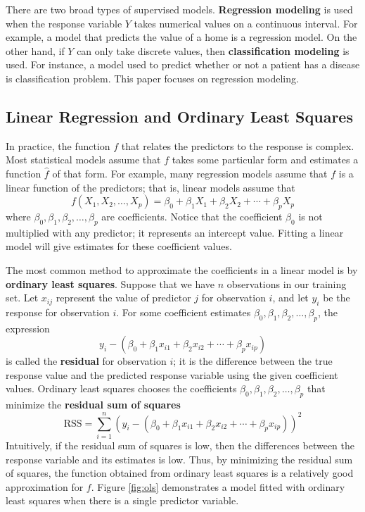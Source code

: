 \documentclass{article}
\begin{document}
There are two broad types of supervised models. \textbf{Regression modeling} is used when the response variable $Y$ takes numerical values on a continuous interval. For example, a model that predicts the value of a home is a regression model. On the other hand, if $Y$ can only take discrete values, then \textbf{classification modeling} is used. For instance, a model used to predict whether or not a patient has a disease is classification problem. This paper focuses on regression modeling.

\subsection{Linear Regression and Ordinary Least Squares}

In practice, the function $f$ that relates the predictors to the response is complex. Most statistical models assume that $f$ takes some particular form and estimates a function $\hat{f}$ of that form. For example, many regression models assume that $f$ is a linear function of the predictors; that is, linear models assume that
\begin{equation}\label{eqn:linear-model}
	f(X_1, X_2, \dotsc, X_p) = \beta_0 + \beta_1 X_1 + \beta_2 X_2 + \cdots + \beta_p X_p
\end{equation}
where $\beta_0, \beta_1, \beta_2, \dotsc, \beta_p$ are coefficients. Notice that the coefficient $\beta_0$ is not multiplied with any predictor; it represents an intercept value. Fitting a linear model will give estimates for these coefficient values.

The most common method to approximate the coefficients in a linear model is by \textbf{ordinary least squares}. Suppose that we have $n$ observations in our training set. Let $x_{ij}$ represent the value of predictor $j$ for observation $i$, and let $y_i$ be the response for observation $i$. For some coefficient estimates $\beta_0, \beta_1, \beta_2, \dotsc, \beta_p$, the expression
\begin{equation}
	y_i - (\beta_0 + \beta_1 x_{i1} + \beta_2 x_{i2} + \cdots + \beta_p x_{ip})
\end{equation}
is called the \textbf{residual} for observation $i$; it is the difference between the true response value and the predicted response variable using the given coefficient values. Ordinary least squares chooses the coefficients $\beta_0, \beta_1, \beta_2, \dotsc, \beta_p$ that minimize the \textbf{residual sum of squares}
\begin{equation}\label{eqn:RSS}
	\text{RSS} = \sum\limits_{i = 1}^n (y_i - (\beta_0 + \beta_1 x_{i1} + \beta_2 x_{i2} + \cdots + \beta_p x_{ip}))^2
\end{equation}
Intuitively, if the residual sum of squares is low, then the differences between the response variable and its estimates is low. Thus, by minimizing the residual sum of squares, the function obtained from ordinary least squares is a relatively good approximation for $f$. Figure \ref{fig:ols} demonstrates a model fitted with ordinary least squares when there is a single predictor variable.
\end{document}
